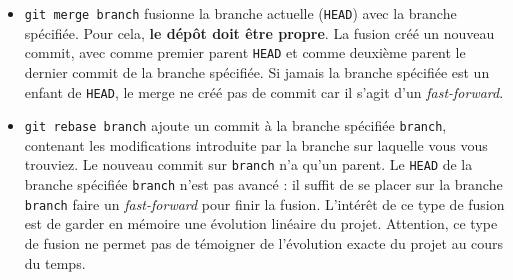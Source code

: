 \documentclass[french]{report}
\newcommand\itemb{\item[$\bullet$]}
\begin{document}
\begin{itemize}
    \itemb \texttt{git merge branch} fusionne la branche actuelle (\texttt{HEAD}) avec la branche spécifiée.
    Pour cela, \textbf{le dépôt doit être propre}.
    La fusion créé un nouveau commit, avec comme premier parent \texttt{HEAD} et comme deuxième parent le dernier commit de la branche spécifiée.
    Si jamais la branche spécifiée est un enfant de \texttt{HEAD}, le merge ne créé pas de commit car il s'agit d'un \textit{fast-forward}.
    \itemb \texttt{git rebase branch} ajoute un commit à la branche spécifiée \texttt{branch}, contenant les modifications introduite par la branche sur laquelle vous vous trouviez.
    Le nouveau commit sur \texttt{branch} n'a qu'un parent.
    Le \texttt{HEAD} de la branche spécifiée \texttt{branch} n'est pas avancé : il suffit de se placer sur la branche \texttt{branch} faire un \textit{fast-forward} pour finir la fusion.
    L'intérêt de ce type de fusion est de garder en mémoire une évolution linéaire du projet.
    Attention, ce type de fusion ne permet pas de témoigner de l'évolution exacte du projet au cours du temps.
\end{itemize}
\end{document}
